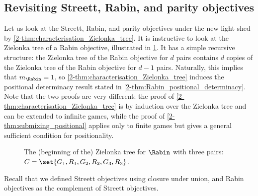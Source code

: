 \subsection*{Revisiting Streett, Rabin, and parity objectives}
Let us look at the Streett, Rabin, and parity objectives under the new light shed by \cref{2-thm:characterisation_Zielonka_tree}.
It is instructive to look at the Zielonka tree of a Rabin objective, illustrated in \cref{2-fig:Zielonka_tree_Rabin}.
It has a simple recursive structure: the Zielonka tree of the Rabin objective for $d$ pairs contains $d$ copies
of the Zielonka tree of the Rabin objective for $d-1$ pairs.
Naturally, this implies that $m_{\Rabin} = 1$, so \cref{2-thm:characterisation_Zielonka_tree} induces the positional determinacy result
stated in \cref{2-thm:Rabin_positional_determinacy}.
Note that the two proofs are very different: the proof of \cref{2-thm:characterisation_Zielonka_tree} is by induction over the Zielonka tree and can be extended to infinite games, while the proof of \cref{2-thm:submixing_positional} applies only to finite games but gives a general sufficient condition for positionality.

\begin{figure}
\centering
\caption{The (beginning of the) Zielonka tree for $\Rabin$ with three pairs: 
$C = \set{G_1,R_1,G_2,R_2,G_3,R_3}$.}
\label{2-fig:Zielonka_tree_Rabin}
\end{figure}

Recall that we defined Streett objectives using closure under union, and Rabin objectives as the complement of Streett objectives.

